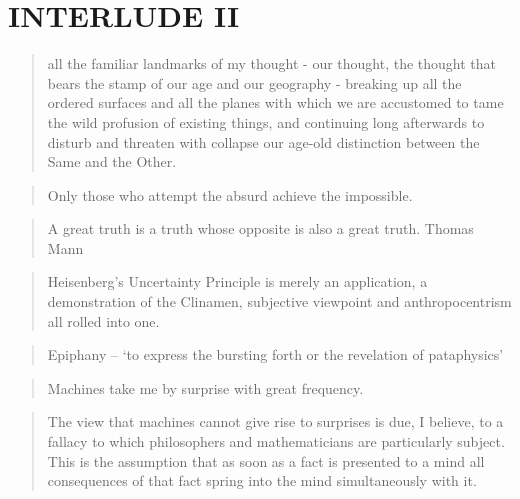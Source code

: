 
\pagestyle{empty}

\chapter*{INTERLUDE II}
\label{interlude2}



\begin{quotation}
  all the familiar landmarks of my thought - our thought, the thought that bears the stamp of our age and our geography - breaking up all the ordered surfaces and all the planes with which we are accustomed to tame the wild profusion of existing things, and continuing long afterwards to disturb and threaten with collapse our age-old distinction between the Same and the Other. 
\end{quotation}

\begin{quotation}
    Only those who attempt the absurd achieve the impossible. 
\end{quotation}

\begin{quotation}
    A great truth is a truth whose opposite is also a great truth. Thomas Mann 
\end{quotation}

\begin{quotation}
    Heisenberg's Uncertainty Principle is merely an application, a demonstration of the Clinamen, subjective viewpoint and anthropocentrism all rolled into one. 
\end{quotation}

\begin{quotation}
    Epiphany – `to express the bursting forth or the revelation of pataphysics' 
\end{quotation}

\begin{quotation}
    Machines take me by surprise with great frequency.
\end{quotation}

\begin{quotation}
    The view that machines cannot give rise to surprises is due, I believe, to a fallacy to which philosophers and mathematicians are particularly subject. This is the assumption that as soon as a fact is presented to a mind all consequences of that fact spring into the mind simultaneously with it.
\end{quotation}

